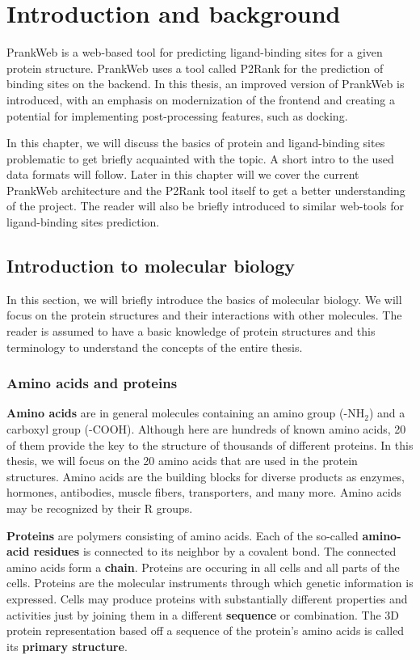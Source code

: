 \chapter{Introduction and background}
\label{chap:intro}

PrankWeb is a web-based tool for predicting ligand-binding sites for a given protein structure. PrankWeb uses a tool called P2Rank for the prediction of binding sites on the backend. In this thesis, an improved version of PrankWeb is introduced, with an emphasis on modernization of the frontend and creating a potential for implementing post-processing features, such as docking.

In this chapter, we will discuss the basics of protein and ligand-binding sites problematic to get briefly acquainted with the topic. A short intro to the used data formats will follow. Later in this chapter will we cover the current PrankWeb architecture and the P2Rank tool itself to get a better understanding of the project. The reader will also be briefly introduced to similar web-tools for ligand-binding sites prediction.

\section{Introduction to molecular biology}
\label{sec:mol_bio}

In this section, we will briefly introduce the basics of molecular biology. We will focus on the protein structures and their interactions with other molecules. The reader is assumed to have a basic knowledge of protein structures and this terminology to understand the concepts of the entire thesis.

\subsection{Amino acids and proteins}
\label{subsec:amino_acids}

\textbf{Amino acids} are in general molecules containing an amino group (-NH$_2$) and a carboxyl group (-COOH). Although here are hundreds of known amino acids, 20 of them provide the key to the structure of thousands of different proteins. In this thesis, we will focus on the 20 amino acids that are used in the protein structures. Amino acids are the building blocks for diverse products as enzymes, hormones, antibodies, muscle fibers, transporters, and many more. Amino acids may be recognized by their R groups.

\textbf{Proteins} are polymers consisting of amino acids. Each of the so-called \textbf{amino-acid residues} is connected to its neighbor by a covalent bond. The connected amino acids form a \textbf{chain}. Proteins are occuring in all cells and all parts of the cells. Proteins are the molecular instruments through which genetic information is expressed. Cells may produce proteins with substantially different properties and activities just by joining them in a different \textbf{sequence} or combination. The 3D protein representation based off a sequence of the protein's amino acids is called its \textbf{primary structure}. \cite{nelson2008lehninger}

